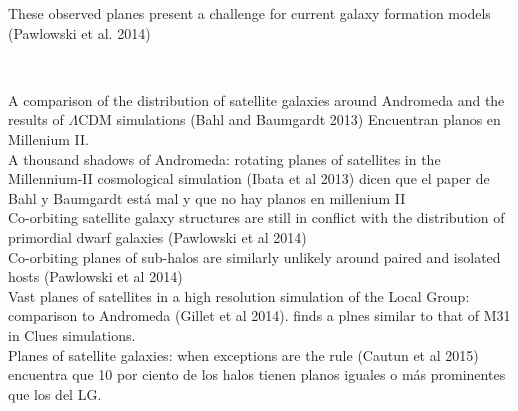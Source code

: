 \documentclass{emulateapj}
\begin{document}
These observed planes present a challenge for current galaxy formation
models (Pawlowski et al. 2014)


\

\noindent A comparison of the distribution of satellite galaxies
around Andromeda and the results of $\Lambda$CDM simulations (Bahl and
Baumgardt 2013) Encuentran planos en Millenium II.\\
A thousand shadows of Andromeda: rotating planes of satellites in the
Millennium-II cosmological simulation (Ibata et al 2013) dicen que el
paper de Bahl y Baumgardt est\'a mal y que no hay planos en millenium
II\\
Co-orbiting satellite galaxy structures are still in conflict with the
distribution of primordial dwarf galaxies (Pawlowski et al 2014)\\
Co-orbiting planes of sub-halos are similarly unlikely around paired
and isolated hosts (Pawlowski et al 2014)\\
Vast planes of satellites in a high resolution simulation of the Local
Group: comparison to Andromeda (Gillet et al 2014). finds a plnes
similar to that of M31 in Clues simulations.\\
Planes of satellite galaxies: when exceptions are the rule (Cautun et
al 2015) encuentra que 10 por ciento de los halos tienen planos
iguales o m\'as prominentes que los del LG.\\
\end{document}
